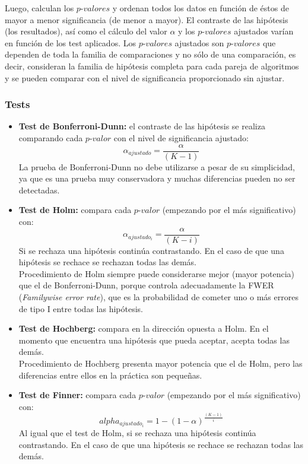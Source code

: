 Luego, calculan los $\textit{p-valor}es$ y ordenan todos los datos en función de éstos de mayor a menor 
significancia (de menor a mayor). El contraste de las hipótesis (los resultados), así como el cálculo del valor
$\alpha$ y los $\textit{p-valor}es$ ajustados varían en función de los test aplicados. Los $\textit{p-valor}es$
ajustados son $\textit{p-valor}es$ que dependen de toda la familia de comparaciones y no sólo de una comparación,
es decir, consideran la familia de hipótesis completa para cada pareja de algoritmos y se pueden comparar con el
nivel de significancia proporcionado sin ajustar.

\subsubsection{Tests}
\begin{itemize}
\item \textbf{Test de Bonferroni-Dunn:} el contraste de las hipótesis se realiza comparando cada $\textit{p-valor}$ con
el nivel de significancia ajustado:
\[ \alpha_{ajustado} = \frac{\alpha}{(K-1)} \]
La prueba de Bonferroni-Dunn no debe utilizarse a pesar de su simplicidad, ya que es una prueba muy conservadora y muchas diferencias pueden no ser detectadas.
\item \textbf{Test de Holm:} compara cada $\textit{p-valor}$ (empezando por el más significativo) con:
\[ \alpha_{ajustado_i} = \frac{\alpha}{(K-i)} \]
Si se rechaza una hipótesis continúa contrastando. En el caso de que una hipótesis se rechace se rechazan todas
las demás.\\
Procedimiento de Holm siempre puede considerarse mejor (mayor potencia) que el de Bonferroni-Dunn, porque controla adecuadamente la FWER (\textit{Familywise error rate}), que es la probabilidad de cometer uno o más errores de tipo I entre todas las hipótesis.
\item \textbf{Test de Hochberg:} compara en la dirección opuesta a Holm. En el momento que encuentra una hipótesis
que pueda aceptar, acepta todas las demás.\\
Procedimiento de Hochberg presenta mayor potencia que el de Holm, pero las diferencias entre ellos en la práctica son pequeñas. 
\item \textbf{Test de Finner:} compara cada $\textit{p-valor}$ (empezando por el más significativo) con:
\[ alpha_{ajustado_i} = 1-(1-\alpha)^{\frac{(K-1)}{i}} \]
Al igual que el test de Holm, si se rechaza una hipótesis continúa contrastando. En el caso de que una hipótesis se rechace se rechazan todas las demás.\\

\end{itemize}
